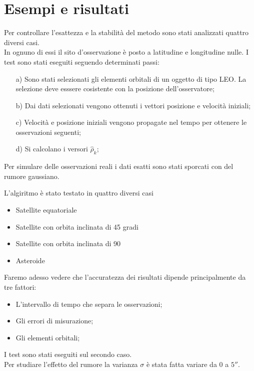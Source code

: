 \documentclass{beamer}
\begin{document}
\section{Esempi e risultati}
\begin{frame}
Per controllare l'esattezza e la stabilit\`a del metodo sono stati analizzati quattro diversi casi. \\
In ognuno di essi il sito d'osservazione \`e posto a latitudine e longitudine nulle. I test sono stati eseguiti seguendo determinati passi: \begin{itemize}
\item[a)] Sono stati selezionati gli elementi orbitali di un oggetto di tipo LEO. La selezione deve esssere cosistente con la posizione dell'osservatore;
\item[b)] Dai dati selezionati vengono ottenuti i vettori posizione e velocit\`a iniziali;
\item[c)] Velocit\`a e posizione iniziali vengono propagate nel tempo per ottenere le osservazioni seguenti;
\item[d)] Si calcolano i versori $\hat{\rho}_k$;
\end{itemize}
\end{frame}
\begin{frame}
Per simulare delle osservazioni reali i dati esatti sono stati sporcati con del rumore gaussiano.
\end{frame}
\begin{frame}
L'algiritmo \`e stato testato in quattro diversi casi \begin{itemize}
\item Satellite equatoriale
\item Satellite con orbita inclinata di 45 gradi
\item Satellite con orbita inclinata di 90
\item Asteroide
\end{itemize}
\end{frame}


\begin{frame}
Faremo adesso vedere che l'accuratezza dei risultati dipende principalmente da tre fattori: \begin{itemize}
\item L'intervallo di tempo che separa le osservazioni;
\item Gli errori di misurazione;
\item Gli elementi orbitali;
\end{itemize}
I test sono stati eseguiti sul secondo caso. \\
Per studiare l'effetto del rumore la varianza $\sigma$ \`e stata fatta variare da $0$ a $5''$.
\end{frame}
\end{document}
